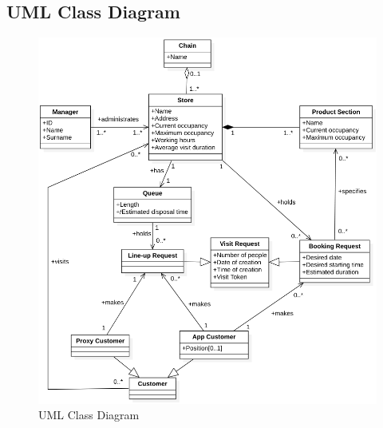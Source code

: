 \documentclass[a4paper,oneside,11pt]{book}   %
\begin{document}
    \subsection{UML Class Diagram} 
    \begin{figure}[H]
        \centering
        \includegraphics[width=\textwidth, height=\textheight, keepaspectratio]{pictures/uml_class_diagram}
        \caption{UML Class Diagram}
        \label{figure:uml}
    \end{figure}
\end{document}
